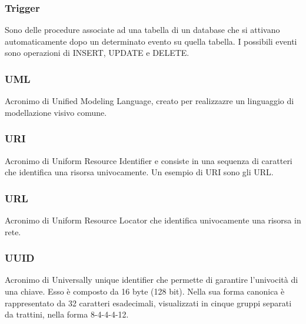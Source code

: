 \subsubsection*{Trigger}
Sono delle procedure associate ad una tabella di un database che si attivano automaticamente dopo un determinato evento su quella tabella. I possibili eventi sono operazioni di INSERT, UPDATE e DELETE.
\subsubsection*{UML}
Acronimo di Unified Modeling Language, creato per realizzazre un linguaggio di modellazione visivo comune.
\subsubsection*{URI}
Acronimo di Uniform Resource Identifier e consiste in una sequenza di caratteri che identifica una risorsa univocamente. Un esempio di URI sono gli URL.
\subsubsection*{URL}
Acronimo di Uniform Resource Locator che identifica univocamente una risorsa in rete.
\subsubsection*{UUID}
Acronimo di Universally unique identifier che permette di garantire l'univocità di una chiave. Esso è composto da 16 byte (128 bit). Nella sua forma canonica è rappresentato da 32 caratteri esadecimali, visualizzati in cinque gruppi separati da trattini, nella forma 8-4-4-4-12.
